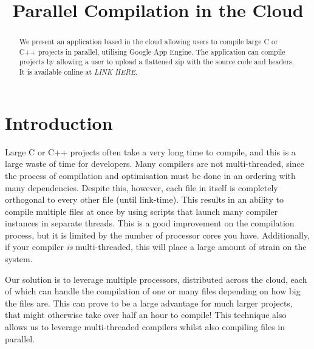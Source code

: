 \documentclass[conference]{IEEEtran}
\begin{document}
\title{Parallel Compilation in the Cloud}

\author{
\and
{}
}

\maketitle

\begin{abstract}
We present an application based in the cloud allowing users to compile large C
or C++ projects in parallel, utilising Google App Engine. The application can
compile projects by allowing a user to upload a flattened zip with the source
code and headers. It is available online at \emph{LINK HERE}.
\end{abstract}
\section{Introduction}
Large C or C++ projects often take a very long time to compile, and this is a
large waste of time for developers. Many compilers are not multi-threaded,
since the process of compilation and optimisation must be done in an ordering with
many dependencies. Despite this, however, each file in itself is completely
orthogonal to every other file (until link-time). This results in an ability to
compile multiple files at once by using scripts that launch many compiler
instances in separate threads. This is a good improvement on the compilation
process, but it is limited by the number of processor cores you have.
Additionally, if your compiler \emph{is} multi-threaded, this will place a large
amount of strain on the system.

Our solution is to leverage multiple processors, distributed across the cloud,
each of which can handle the compilation of one or many files depending on how
big the files are. This can prove to be a large advantage for much larger
projects, that might otherwise take over half an hour to compile! This technique
also allows us to leverage multi-threaded compilers whilst also compiling files
in parallel.
\end{document}
